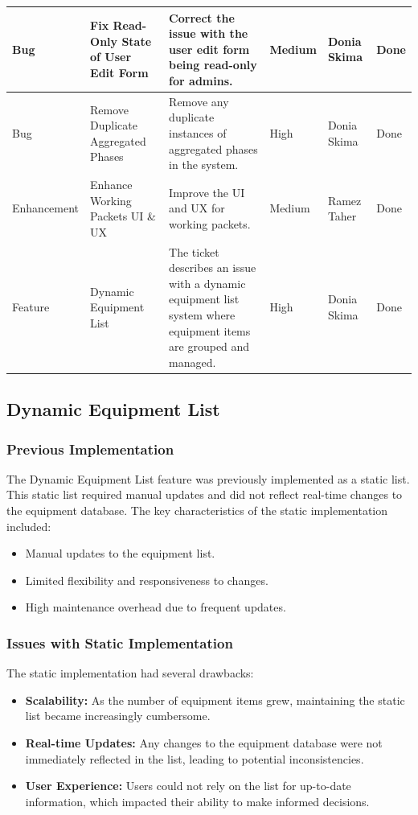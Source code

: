 \begin{longtable}{|p{2.5cm}|p{2cm}|p{2.75cm}|p{1.75cm}|p{1.75cm}|p{1.25cm}|}
    \hline
    Bug & Fix Read-Only State of User Edit Form & Correct the issue with the user edit form being read-only for admins. & Medium & Donia Skima & Done \\
    \hline
    Bug & Remove Duplicate Aggregated Phases & Remove any duplicate instances of aggregated phases in the system. & High & Donia Skima & Done \\
    \hline
    Enhancement & Enhance Working Packets UI \& UX & Improve the UI and UX for working packets. & Medium & Ramez Taher & Done \\
    \hline
    Feature & Dynamic Equipment List & The ticket describes an issue with a dynamic equipment list system where equipment items are grouped and managed. & High & Donia Skima & Done \\
    \hline
    \end{longtable}
    \subsection{Dynamic Equipment List}
    \subsubsection{Previous Implementation}
    The Dynamic Equipment List feature was previously implemented as a static list. This static list required manual updates and did not reflect real-time changes to the equipment database. The key characteristics of the static implementation included:
    \begin{itemize}
        \item Manual updates to the equipment list.
        \item Limited flexibility and responsiveness to changes.
        \item High maintenance overhead due to frequent updates.
    \end{itemize}
    
    \subsubsection{Issues with Static Implementation}
    The static implementation had several drawbacks:
    \begin{itemize}
        \item \textbf{Scalability:} As the number of equipment items grew, maintaining the static list became increasingly cumbersome.
        \item \textbf{Real-time Updates:} Any changes to the equipment database were not immediately reflected in the list, leading to potential inconsistencies.
        \item \textbf{User Experience:} Users could not rely on the list for up-to-date information, which impacted their ability to make informed decisions.
    \end{itemize}
    
